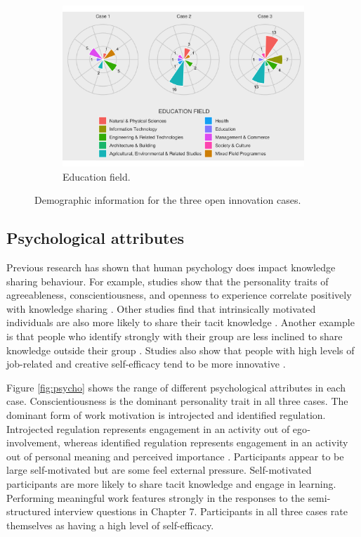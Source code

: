 \begin{figure}[hbt!]
\begin{subfigure}[b]{0.7\textwidth}
\includegraphics[width=1\linewidth]{Images/ed_field.png}
\caption{Education field.}
\end{subfigure}

\caption[Demographic information for each case]{Demographic information for the three open innovation cases.}
\label{fig:demographics}
\end{figure}


\subsection{Psychological attributes}

Previous research has shown that human psychology does impact knowledge sharing behaviour. For example, studies show that the personality traits of agreeableness, conscientiousness, and openness to experience correlate positively with knowledge sharing \citep{matzler2011personality,borges2012tacit}. Other studies find that intrinsically motivated individuals are also more likely to share their tacit knowledge \citep{hung2011influence,llopis2016understanding}. Another example is that people who identify strongly with their group are less inclined to share knowledge outside their group \citep{kane2005knowledge,argote2009superordinate,dokko2014one}. Studies also show that people with high levels of job-related and creative self-efficacy tend to be more innovative \citep{farmer2006developing, leonard2014knowledge}. \medskip

Figure \ref{fig:psycho} shows the range of different psychological attributes in each case. Conscientiousness is the dominant personality trait in all three cases. The dominant form of work motivation is introjected and identified regulation. Introjected regulation represents engagement in an activity out of ego‐involvement, whereas identified regulation represents engagement in an activity out of personal meaning and perceived importance \citep{gagne2019different}. Participants appear to be large self-motivated but are some feel external pressure. Self-motivated participants are more likely to share tacit knowledge and engage in learning. Performing meaningful work features strongly in the responses to the semi-structured interview questions in Chapter 7. Participants in all three cases rate themselves as having a high level of self-efficacy. \medskip

